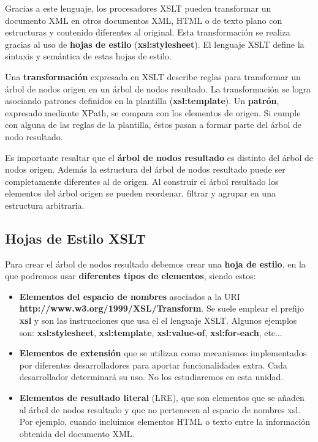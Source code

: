 Gracias a este lenguaje, los procesadores XSLT pueden transformar un documento XML en otros documentos XML, HTML o de texto plano con estructuras y contenido diferentes al original. Esta transformación se realiza gracias al uso de \textbf{hojas de estilo} (\textbf{xsl:stylesheet}). El lenguaje XSLT define la sintaxis y semántica de estas hojas de estilo.

Una \textbf{transformación} expresada en XSLT describe reglas para transformar un árbol de nodos origen en un árbol de nodos resultado. La transformación se logra asociando patrones definidos en la plantilla (\textbf{xsl:template}). Un \textbf{patrón}, expresado mediante XPath, se compara con los elementos de origen.  Si cumple con alguna de las reglas de la plantilla, éstos pasan a formar parte del árbol de nodo resultado.

Es importante resaltar que el \textbf{árbol de nodos resultado} es distinto del árbol de nodos origen. Además la estructura del árbol de nodos resultado puede ser completamente diferentes al de origen. Al construir el árbol resultado los elementos del árbol origen se pueden reordenar, filtrar y agrupar en una estructura arbitraria.

\subsection{Hojas de Estilo XSLT}
Para crear el árbol de nodos resultado debemos crear una \textbf{hoja de estilo}, en la que podremos usar \textbf{diferentes tipos de elementos}, siendo estos:

\begin{itemize}
    \item \textbf{Elementos del espacio de nombres} asociados a la URI \textbf{http://www.w3.org/1999/XSL/Transform}. Se suele emplear el prefijo \textbf{xsl} y son las instrucciones que usa el el lenguaje XSLT. Algunos ejemplos son: \textbf{xsl:stylesheet}, \textbf{xsl:template}, \textbf{xsl:value-of}, \textbf{xsl:for-each}, etc...

    \item \textbf{Elementos de extensión} que se utilizan como mecanismos implementados por diferentes desarrolladores para aportar funcionalidades extra. Cada desarrollador determinará su uso. No los estudiaremos en esta unidad.

    \item \textbf{Elementos de resultado literal} (LRE), que son elementos que se añaden al árbol de nodos resultado y que no pertenecen al espacio de nombres xsl. Por ejemplo, cuando incluimos elementos HTML o texto entre la información obtenida del documento XML.
\end{itemize}

